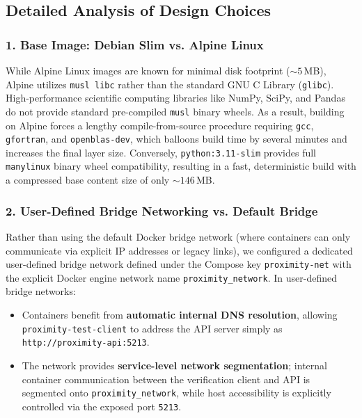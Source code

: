 \documentclass[11pt,a4paper]{article}
\begin{document}
\subsection{Detailed Analysis of Design Choices}

\subsubsection{1. Base Image: Debian Slim vs. Alpine Linux}
While Alpine Linux images are known for minimal disk footprint ($\sim 5$\,MB), Alpine utilizes \texttt{musl libc} rather than the standard GNU C Library (\texttt{glibc}). High-performance scientific computing libraries like NumPy, SciPy, and Pandas do not provide standard pre-compiled \texttt{musl} binary wheels. As a result, building on Alpine forces a lengthy compile-from-source procedure requiring \texttt{gcc}, \texttt{gfortran}, and \texttt{openblas-dev}, which balloons build time by several minutes and increases the final layer size. Conversely, \texttt{python:3.11-slim} provides full \texttt{manylinux} binary wheel compatibility, resulting in a fast, deterministic build with a compressed base content size of only $\sim 146$\,MB.

\subsubsection{2. User-Defined Bridge Networking vs. Default Bridge}
Rather than using the default Docker bridge network (where containers can only communicate via explicit IP addresses or legacy links), we configured a dedicated user-defined bridge network defined under the Compose key \texttt{proximity-net} with the explicit Docker engine network name \texttt{proximity\_network}. In user-defined bridge networks:
\begin{itemize}[itemsep=1pt, topsep=1pt]
    \item Containers benefit from \textbf{automatic internal DNS resolution}, allowing \texttt{proximity-test-client} to address the API server simply as \texttt{http://proximity-api:5213}.
    \item The network provides \textbf{service-level network segmentation}; internal container communication between the verification client and API is segmented onto \texttt{proximity\_network}, while host accessibility is explicitly controlled via the exposed port \texttt{5213}.
\end{itemize}
\end{document}
